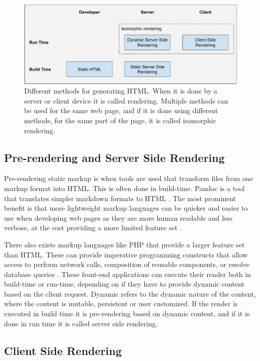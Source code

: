 \begin{figure}
    \centering
    \includegraphics[width=\linewidth]{images/fe-rendering.pdf}
    \caption{Different methods for generating \ac{HTML}. When it is done by a server or client device it is called rendering. Multiple methods can be used for the same web page, and if it is done using different methods, for the same part of the page, it is called isomorphic rendering.}
    \label{fig:fe-render-methods}
\end{figure}

\subsection{Pre-rendering and Server Side Rendering}

Pre-rendering static markup is when tools are used that transform files from one markup format into \ac{HTML}. This is often done in build-time. Pandoc is a tool that translates simpler markdown formats to \ac{HTML} \cite{Dominici2014}. The most prominent benefit is that more lightweight markup languages can be quicker and easier to use when developing web pages as they are more human readable and less verbose, at the cost providing a more limited feature set \cite{Dominici2014}.

There also exists markup languages like PHP that provide a larger feature set than \ac{HTML}. These can provide imperative programming constructs that allow access to perform network calls, composition of reusable components, or resolve database queries \cite{Royappa2000}. These front-end applications can execute their render both in build-time or run-time, depending on if they have to provide dynamic content based on the client request. Dynamic refers to the dynamic nature of the content, where the content is mutable, persistent or user customized. If the render is executed in build time it is pre-rendering based on dynamic content, and if it is done in run time it is called server side rendering.

\subsection{Client Side Rendering}


